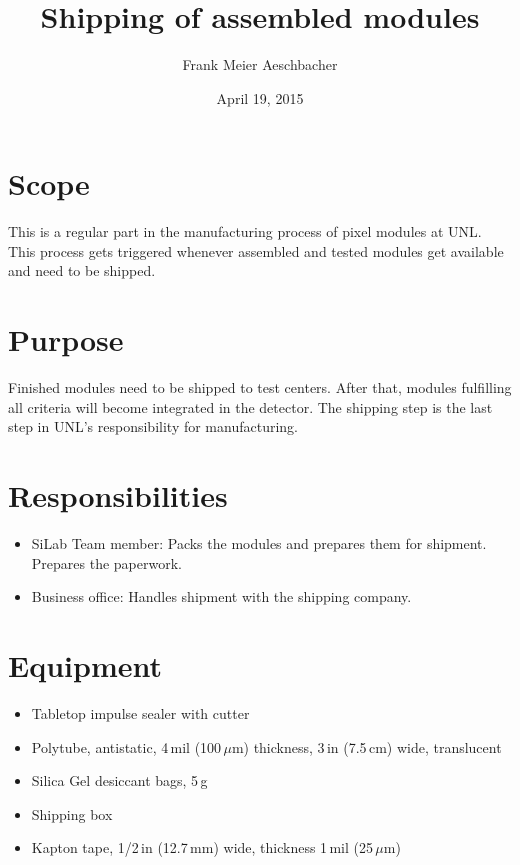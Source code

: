 \documentclass[12pt]{unlsilabsop}
\title{Shipping of assembled modules}
\date{April 19, 2015}
\author{Frank Meier Aeschbacher}
\begin{document}
\maketitle

\section{Scope}
This is a regular part in the manufacturing process of pixel modules at UNL. This process gets triggered whenever assembled and tested modules get available and need to be shipped.

\section{Purpose}
Finished modules need to be shipped to test centers. After that, modules fulfilling all criteria will become integrated in the detector. The shipping step is the last step in UNL's responsibility for manufacturing.


\section{Responsibilities}

\begin{itemize}
    \item SiLab Team member: Packs the modules and prepares them for shipment. Prepares the paperwork.
    \item Business office: Handles shipment with the shipping company.
\end{itemize}

\section{Equipment}

\begin{itemize}
    \item Tabletop impulse sealer with cutter
    \item Polytube, antistatic, 4\,mil (100\,$\mu$m) thickness, 3\,in (7.5\,cm) wide, translucent
    \item Silica Gel desiccant bags, 5\,g
    \item Shipping box
    \item Kapton tape, 1/2\,in (12.7\,mm) wide, thickness 1\,mil (25\,$\mu$m)
\end{itemize}
\end{document}
